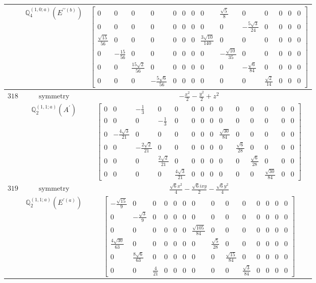 \documentclass[fleqn,8pt,landscape]{jsarticle}
\begin{document}
\begin{longtable}{ccc}
$  $ & $ \mathbb{Q}_{4}^{(1,0;a)}(E^{\prime\prime(b)}) $ & $ \begin{bmatrix} 0 & 0 & 0 & 0 & 0 & 0 & 0 & 0 & \frac{\sqrt{5}}{8} & 0 & 0 & 0 & 0 & 0 \\ 0 & 0 & 0 & 0 & 0 & 0 & 0 & 0 & 0 & - \frac{5 \sqrt{3}}{24} & 0 & 0 & 0 & 0 \\ \frac{\sqrt{15}}{56} & 0 & 0 & 0 & 0 & 0 & 0 & \frac{3 \sqrt{10}}{140} & 0 & 0 & 0 & 0 & 0 & 0 \\ 0 & - \frac{15}{56} & 0 & 0 & 0 & 0 & 0 & 0 & - \frac{\sqrt{10}}{35} & 0 & 0 & 0 & 0 & 0 \\ 0 & 0 & \frac{15 \sqrt{2}}{56} & 0 & 0 & 0 & 0 & 0 & 0 & - \frac{\sqrt{6}}{84} & 0 & 0 & 0 & 0 \\ 0 & 0 & 0 & - \frac{5 \sqrt{6}}{56} & 0 & 0 & 0 & 0 & 0 & 0 & \frac{\sqrt{2}}{14} & 0 & 0 & 0 \end{bmatrix} $ \\ \hline
$ 318 $ & $ \text{symmetry} $ & $ - \frac{x^{2}}{2} - \frac{y^{2}}{2} + z^{2} $ \\
$  $ & $ \mathbb{Q}_{2}^{(1,1;a)}(A^{\prime}) $ & $ \begin{bmatrix} 0 & 0 & - \frac{1}{3} & 0 & 0 & 0 & 0 & 0 & 0 & 0 & 0 & 0 & 0 & 0 \\ 0 & 0 & 0 & - \frac{1}{3} & 0 & 0 & 0 & 0 & 0 & 0 & 0 & 0 & 0 & 0 \\ 0 & - \frac{4 \sqrt{3}}{21} & 0 & 0 & 0 & 0 & 0 & 0 & \frac{\sqrt{30}}{84} & 0 & 0 & 0 & 0 & 0 \\ 0 & 0 & - \frac{2 \sqrt{2}}{21} & 0 & 0 & 0 & 0 & 0 & 0 & \frac{\sqrt{6}}{28} & 0 & 0 & 0 & 0 \\ 0 & 0 & 0 & \frac{2 \sqrt{2}}{21} & 0 & 0 & 0 & 0 & 0 & 0 & \frac{\sqrt{6}}{28} & 0 & 0 & 0 \\ 0 & 0 & 0 & 0 & \frac{4 \sqrt{3}}{21} & 0 & 0 & 0 & 0 & 0 & 0 & \frac{\sqrt{30}}{84} & 0 & 0 \end{bmatrix} $ \\ \hline
$ 319 $ & $ \text{symmetry} $ & $ \frac{\sqrt{6} x^{2}}{4} - \frac{\sqrt{6} i x y}{2} - \frac{\sqrt{6} y^{2}}{4} $ \\
$  $ & $ \mathbb{Q}_{2}^{(1,1;a)}(E^{\prime(a)}) $ & $ \begin{bmatrix} - \frac{\sqrt{15}}{9} & 0 & 0 & 0 & 0 & 0 & 0 & 0 & 0 & 0 & 0 & 0 & 0 & 0 \\ 0 & - \frac{\sqrt{3}}{9} & 0 & 0 & 0 & 0 & 0 & 0 & 0 & 0 & 0 & 0 & 0 & 0 \\ 0 & 0 & 0 & 0 & 0 & 0 & \frac{\sqrt{105}}{84} & 0 & 0 & 0 & 0 & 0 & 0 & 0 \\ \frac{4 \sqrt{30}}{63} & 0 & 0 & 0 & 0 & 0 & 0 & \frac{\sqrt{5}}{28} & 0 & 0 & 0 & 0 & 0 & 0 \\ 0 & \frac{8 \sqrt{6}}{63} & 0 & 0 & 0 & 0 & 0 & 0 & \frac{\sqrt{15}}{84} & 0 & 0 & 0 & 0 & 0 \\ 0 & 0 & \frac{4}{21} & 0 & 0 & 0 & 0 & 0 & 0 & \frac{\sqrt{3}}{84} & 0 & 0 & 0 & 0 \end{bmatrix} $ \\ \hline

\end{longtable}
\end{document}
